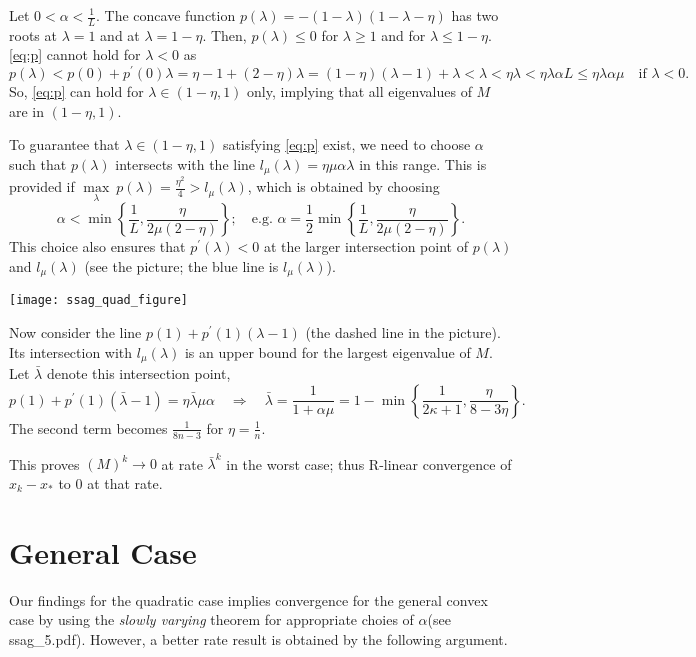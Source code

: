 \documentclass{article}
\begin{document}
Let $0<\alpha<\frac{1}{L}$.  The concave function $p(\lambda)= -(1-\lambda)(1-\lambda-\eta)$ has two roots at $\lambda=1$ and at $\lambda=1-\eta$.  Then, $p(\lambda)\leq0$ for $\lambda\geq1$ and for $\lambda\leq1-\eta$.  \eqref{eq:p} cannot hold for $\lambda < 0$ as 
\[
p(\lambda)<p(0)+p^\prime(0)\lambda=\eta-1+(2-\eta)\lambda=(1-\eta)(\lambda-1)+\lambda<\lambda<\eta\lambda<\eta\lambda\alpha L\leq\eta\lambda\alpha \mu \quad \mbox{if }\lambda<0. 
\]
So, \eqref{eq:p} can hold for $ \lambda \in (1-\eta,1)$ only, implying that all eigenvalues of $M$ are in $(1-\eta,1)$.

To guarantee that $\lambda\in (1-\eta,1)$ satisfying \eqref{eq:p} exist, we need to choose $\alpha$ such that $p(\lambda)$ intersects with the line $l_\mu(\lambda)=\eta\mu\alpha\lambda$ in this range.  This is provided if $\underset{\lambda}{\max} \ p(\lambda) = \displaystyle \frac{\eta^2}{4} > l_\mu(\lambda)$, which is obtained by choosing
\[
  \alpha < \min\left\lbrace \frac{1}{L}, \frac{\eta}{2\mu(2-\eta)} \right\rbrace; \quad \mbox{e.g. } \alpha = \frac{1}{2}\min\left\lbrace \frac{1}{L}, \frac{\eta}{2\mu(2-\eta)} \right\rbrace.
\]
This choice also ensures that $p^\prime(\lambda)<0$ at the larger intersection point of $p(\lambda)$ and $l_\mu(\lambda)$ (see the picture; the blue line is $l_\mu(\lambda)$).
\begin{center}
\texttt{[image: ssag\_quad\_figure]}
\end{center}
Now consider the line $p(1)+p^\prime(1)(\lambda-1)$ (the dashed line in the picture).  Its intersection with $l_\mu(\lambda)$ is an upper bound for the largest eigenvalue of $M$.  Let $\bar \lambda$ denote this intersection point,
\[
 p(1)+p^\prime(1)(\bar\lambda-1) = \eta\bar\lambda\mu\alpha \quad \Rightarrow \quad \bar\lambda = \frac{1}{1+\alpha\mu} = 1 - \min \left\lbrace \frac{1}{2\kappa +1}, \frac{\eta}{8-3\eta} \right\rbrace.
\]
The second term becomes $\displaystyle\frac{1}{8n-3}$ for $\eta =\displaystyle \frac{1}{n}$.  

\bigskip\noindent

This proves $(M)^k \rightarrow 0$ at rate $\bar \lambda^k$ in the worst case; thus R-linear convergence of $x_k-x_\ast$ to 0 at that rate.

\bigskip\bigskip

\section{General Case}

Our findings for the quadratic case implies convergence for the general convex case by using the \emph{slowly varying} theorem for appropriate choies of $\alpha$(see ssag\_5.pdf).  However, a better rate result is obtained by the following argument.
\end{document}
